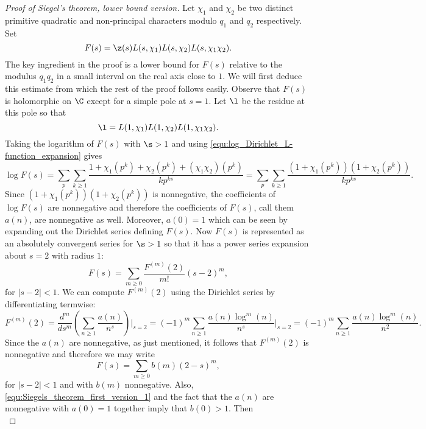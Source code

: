       \begin{proof}[Proof of Siegel's theorem, lower bound version]
        Let $\chi_{1}$ and $\chi_{2}$ be two distinct primitive quadratic and non-principal characters modulo $q_{1}$ and $q_{2}$ respectively. Set
        \[
          F(s) = \z(s)L(s,\chi_{1})L(s,\chi_{2})L(s,\chi_{1}\chi_{2}).
        \]
        The key ingredient in the proof is a lower bound for $F(s)$ relative to the modulus $q_{1}q_{2}$ in a small interval on the real axis close to $1$. We will first deduce this estimate from which the rest of the proof follows easily. Observe that $F(s)$ is holomorphic on $\C$ except for a simple pole at $s = 1$. Let $\l$ be the residue at this pole so that
        \[
          \l = L(1,\chi_{1})L(1,\chi_{2})L(1,\chi_{1}\chi_{2}).
        \]
        Taking the logarithm of $F(s)$ with $\s > 1$ and using \cref{equ:log_Dirichlet_L-function_expansion} gives
        \[
          \log F(s) = \sum_{p}\sum_{k \ge 1}\frac{1+\chi_{1}(p^{k})+\chi_{2}(p^{k})+(\chi_{1}\chi_{2})(p^{k})}{kp^{ks}} = \sum_{p}\sum_{k \ge 1}\frac{(1+\chi_{1}(p^{k}))(1+\chi_{2}(p^{k}))}{kp^{ks}}.
        \]
        Since $(1+\chi_{1}(p^{k}))(1+\chi_{2}(p^{k}))$ is nonnegative, the coefficients of $\log F(s)$ are nonnegative and therefore the coefficients of $F(s)$, call them $a(n)$, are nonnegative as well. Moreover, $a(0) = 1$ which can be seen by expanding out the Dirichlet series defining $F(s)$. Now $F(s)$ is represented as an absolutely convergent series for $\s > 1$ so that it has a power series expansion about $s = 2$ with radius $1$:
        \[
          F(s) = \sum_{m \ge 0}\frac{F^{(m)}(2)}{m!}(s-2)^{m},
        \]
        for $|s-2| < 1$. We can compute $F^{(m)}(2)$ using the Dirichlet series by differentiating termwise:
        \begin{equation}\label{equ:Siegels_theorem_first_version_1}
          F^{(m)}(2) = \frac{d^{m}}{ds^{m}}\left(\sum_{n \ge 1}\frac{a(n)}{n^{s}}\right)\Bigg|_{s = 2} = (-1)^{m}\sum_{n \ge 1}\frac{a(n)\log^{m}(n)}{n^{s}}\Bigg|_{s = 2} = (-1)^{m}\sum_{n \ge 1}\frac{a(n)\log^{m}(n)}{n^{2}}.
        \end{equation}
        Since the $a(n)$ are nonnegative, as just mentioned, it follows that $F^{(m)}(2)$ is nonnegative and therefore we may write
        \[
          F(s) = \sum_{m \ge 0}b(m)(2-s)^{m},
        \]
        for $|s-2| < 1$ and with $b(m)$ nonnegative. Also, \cref{equ:Siegels_theorem_first_version_1} and the fact that the $a(n)$ are nonnegative with $a(0) = 1$ together imply that $b(0) > 1$. Then
        \begin{equation}\label{equ:Siegels_theorem_first_version_2}

\end{equation}
\end{proof}
